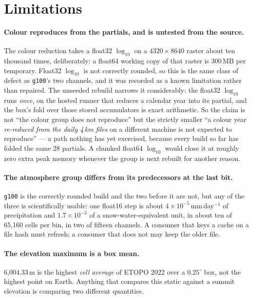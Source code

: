 \documentclass[10pt]{article}
\newcommand{\code}[1]{\texttt{#1}}
\begin{document}
\section{Limitations}

\paragraph{Colour reproduces from the partials, and is untested from the
source.} The colour reduction takes a float32 $\log_{10}$ on a
$4320\times8640$ raster about ten thousand times, deliberately: a float64
working copy of that raster is 300\,MB per temporary. Float32 $\log_{10}$ is
not correctly rounded, so this is the same class of defect as \code{g100}'s
two channels, and it was recorded as a known limitation rather than repaired.
The unseeded rebuild narrows it considerably: the float32 $\log_{10}$ runs
\emph{once}, on the hosted runner that reduces a calendar year into its
partial, and the box's fold over those stored accumulators is exact
arithmetic. So the claim is not ``the colour group does not reproduce'' but
the strictly smaller ``a colour year \emph{re-reduced from the daily 4\,km
files} on a different machine is not expected to reproduce'' --- a path
nothing has yet exercised, because every build so far has folded the same 28
partials. A chunked float64 $\log_{10}$ would close it at roughly zero extra
peak memory whenever the group is next rebuilt for another reason.

\paragraph{The atmosphere group differs from its predecessors at the last
bit.} \code{g100} is the correctly rounded build and the two before it are
not, but any of the three is scientifically usable: one float16 step is about
$4\times10^{-5}$\,mm\,day$^{-1}$ of precipitation and $1.7\times10^{-3}$ of a
snow-water-equivalent unit, in about ten of 65,160 cells per bin, in two of
fifteen channels. A consumer that keys a cache on a file hash must refresh;
a consumer that does not may keep the older file.

\paragraph{The elevation maximum is a box mean.} 6,004.33\,m is the highest
\emph{cell average} of ETOPO 2022 over a $0.25^\circ$ box, not the highest
point on Earth. Anything that compares this static against a summit elevation
is comparing two different quantities.
\end{document}
